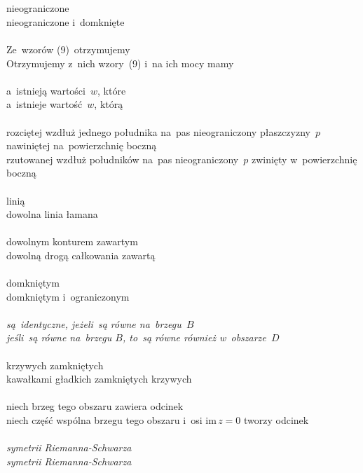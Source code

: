 \documentclass[a4paper,11pt]{article}
\begin{document}
\noi \\
 \\
\Jest nieograniczone \\
\Pow  nieograniczone i~domknięte \\
 \\
\Jest Ze~wzorów (9)~otrzymujemy \\
\Pow  Otrzymujemy z~nich wzory~(9) i~na ich mocy mamy \\
 \\
\Jest a~istnieją wartości~$w$, które \\
\Pow  a~istnieje wartość~$w$, którą \\
 \\
\Jest rozciętej wzdłuż jednego południka na~pas nieograniczony
płaszczyzny~$p$ nawiniętej na~powierzchnię boczną \\
\Pow rzutowanej wzdłuż południków na~pas nieograniczony~$p$ zwinięty
w~powierzchnię boczną \\
 \\
\Jest linią \\
\Pow dowolna linia łamana \\
 \\
\Jest dowolnym konturem zawartym \\
\Pow  dowolną drogą całkowania zawartą \\
 \\
\Jest domkniętym \\
\Pow  domkniętym i~ograniczonym \\
 \\
\Jest \emph{są~identyczne, jeżeli~są równe na~brzegu~$B$} \\
\Pow \emph{jeśli~są równe na~brzegu $B$, to~są równe również
  w~obszarze~$D$} \\
 \\
\Jest krzywych zamkniętych \\
\Pow  kawałkami gładkich zamkniętych krzywych \\
 \\
\Jest niech brzeg tego obszaru zawiera odcinek \\
\Pow  niech część wspólna brzegu tego obszaru i~osi $\textrm{im}\, z = 0$ tworzy odcinek \\
 \\
\Jest \emph{symetrii{ }{ } Riemanna-Schwarza} \\
\Pow \emph{symetrii Riemanna-Schwarza}
\end{document}

